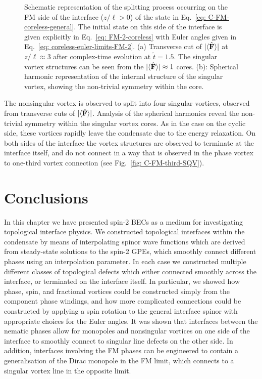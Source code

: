 \begin{figure}
    \caption[Dynamics of a nonsingular vortex connected across a cyclic to
        ferromagnetic interface]
    {\label{fig: C-FM-coreless-FM}Schematic representation of the
        splitting process occurring on the FM side of the interface
        (\(z/\ell > 0\)) of the state in Eq.~\eqref{eq: C-FM-coreless-general}.
        The initial state on this side of the interface is given explicitly in
        Eq.~\eqref{eq: FM-2-coreless} with Euler angles given in
        Eq.~\eqref{eq: coreless-euler-limits-FM-2}.
        (a) Transverse cut of \(|\langle \hat{\vb{F}} \rangle | \) at \(z/\ell \approx 3\) after
        complex-time evolution at \(\tilde{t} = 1.5\).
        The singular vortex structures can be seen from the
        \(|\langle \hat{\vb{F}} \rangle | \approx 1\) cores.
        (b): Spherical harmonic representation of the internal structure of
        the singular vortex, showing the non-trivial symmetry within the core.}
\end{figure}
The nonsingular vortex is observed to split into four singular vortices,
observed from transverse cuts of \(|\langle \hat{\vb{F}} \rangle | \).
Analysis of the spherical harmonics reveal the non-trivial symmetry within
the singular vortex cores.
As in the case on the cyclic side, these vortices rapidly leave the condensate
due to the energy relaxation.
On both sides of the interface the vortex structures are observed to terminate
at the interface itself, and do not connect in a way that is observed in the
phase vortex to one-third vortex connection (see
Fig.~\ref{fig: C-FM-third-SQV}).

\section{Conclusions}
In this chapter we have presented spin-2 BECs as a medium for investigating
topological interface physics.
We constructed topological interfaces within the condensate by means of
interpolating spinor wave functions which are derived from steady-state
solutions to the spin-2 GPEs, which smoothly connect different phases using
an interpolation parameter.
In each case we constructed multiple different classes of topological defects
which either connected smoothly across the interface, or terminated on the
interface itself.
In particular, we showed how phase, spin, and fractional vortices could be
constructed simply from the component phase windings, and how more complicated
connections could be constructed by applying a spin rotation to the general
interface spinor with appropriate choices for the Euler angles.
It was shown that interfaces between the nematic phases allow for monopoles and
nonsingular vortices on one side of the interface to smoothly connect to
singular line defects on the other side.
In addition, interfaces involving the FM phases can be engineered to contain
a generalisation of the Dirac monopole in the FM limit, which connects to a
singular vortex line in the opposite limit.

